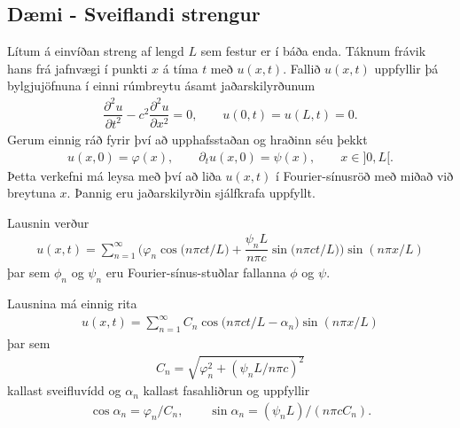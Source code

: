\documentclass[a4paper,10pt,icelandic]{sphinxmanual}
\begin{document}
\subsection{Dæmi - Sveiflandi strengur}
\label{\detokenize{Kafli02:daemi-sveiflandi-strengur}}
Lítum á einvíðan streng af lengd \(L\) sem festur er í báða enda. Táknum frávik hans frá jafnvægi í punkti \(x\) á tíma \(t\) með \(u(x,t)\). Fallið \(u(x,t)\) uppfyllir þá bylgjujöfnuna í einni rúmbreytu ásamt jaðarskilyrðunum
\begin{equation*}
\begin{split}\dfrac{{\partial}^2u}{{\partial}t^2}-
 c^2\dfrac{{\partial}^2u}{{\partial}x^2}=0, \qquad u(0,t)=u(L,t)=0.\end{split}
\end{equation*}
Gerum einnig ráð fyrir því að upphafsstaðan og hraðinn séu þekkt
\begin{equation*}
\begin{split}u(x,0)=\varphi(x), \qquad {\partial}_tu(x,0)={\psi}(x), \qquad x\in
 ]0,L[.\end{split}
\end{equation*}
Þetta verkefni má leysa með því að liða \(u(x,t)\) í Fourier-sínus\textendash{}röð
með miðað við breytuna \(x\). Þannig eru jaðarskilyrðin sjálfkrafa uppfyllt.

Lausnin verður
\begin{equation*}
\begin{split}u(x,t)=\sum\limits_{n=1}^{\infty}
 \bigg(\varphi_n\cos\big(n{\pi}ct/L\big) +
 \dfrac{{\psi}_nL}{n{\pi}c} \sin\big(n{\pi}ct/L\big)\bigg)
 \sin(n{\pi}x/L)\end{split}
\end{equation*}
þar sem \(\phi_n\) og \(\psi_n\) eru Fourier-sínus-stuðlar fallanna \(\phi\) og \(\psi\).

Lausnina má einnig rita
\begin{equation*}
\begin{split}u(x,t)=\sum\limits_{n=1}^{\infty}
 C_n\cos\big(n{\pi}ct/L-{\alpha}_n\big)
 \sin(n{\pi}x/L)\end{split}
\end{equation*}
þar sem
\begin{equation*}
\begin{split}C_n=\sqrt{\varphi_n^2+({\psi}_nL/n{\pi}c)^2}\end{split}
\end{equation*}
kallast sveifluvídd og \({\alpha}_n\) kallast fasahliðrun og uppfyllir
\begin{equation*}
\begin{split}\cos{\alpha}_n= \varphi_n/C_n, \qquad
 \sin{\alpha}_n= ({\psi}_nL)/(n{\pi}cC_n).\end{split}
\end{equation*}
\end{document}
